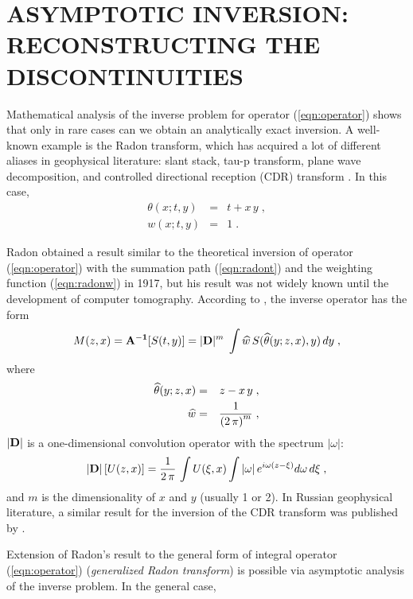 \section{ASYMPTOTIC INVERSION: RECONSTRUCTING THE DISCONTINUITIES}

Mathematical analysis of the inverse problem for operator
(\ref{eqn:operator}) shows that only in rare cases can we obtain an
analytically exact inversion. A well-known example is the Radon
transform, which has acquired a lot of different aliases in
geophysical literature: slant stack, tau-p transform, plane wave
decomposition, and controlled directional reception (CDR) transform
\cite[]{slant}. In this case,
\begin{eqnarray}
\theta(x;t,y) & = & t+x\,y\;,
\label{eqn:radont}\\
 w(x;t,y) & = & 1\;.
\label{eqn:radonw}
\end{eqnarray} 
\par
Radon obtained a result similar to the theoretical inversion of
operator (\ref{eqn:operator}) with the summation path
(\ref{eqn:radont}) and the weighting function (\ref{eqn:radonw}) in
1917, but his result was not widely known until the development of
computer tomography. According to \cite{radon}, the inverse operator
has the form
\begin{equation}
M(z,x) ={\bf A^{-1}}[S(t,y)]= |{\bf D}|^m\;\int
\widehat{w}\,S(\widehat{\theta}(y;z,x),y)\,dy\;,
\label{eqn:radon}
\end{equation}
where 
\begin{eqnarray}
\widehat{\theta}(y;z,x) & = & z-x\,y\;,
\\
\widehat{w}  & = & {1\over {\left(2\,\pi\right)^m}}\;,
\end{eqnarray} 
$|{\bf D}|$ is a one-dimensional convolution operator with the
spectrum $|\omega|$:
\begin{equation}
  \label{eq:rho}
  |{\bf D}| \left[U(z,x)\right] = \frac{1}{2\,\pi}\,
  \int U(\xi,x) \int |\omega|\,e^{i \omega (z-\xi)} d \omega \, d \xi\;,
\end{equation}
 and $m$ is the dimensionality of $x$ and $y$
(usually 1 or 2).  In Russian geophysical literature, a similar result
for the inversion of the CDR transform was published by \cite{nakham}.
\par
Extension of Radon's result to the general form of integral operator
(\ref{eqn:operator}) ({\em generalized Radon transform}) is possible
via asymptotic analysis of the inverse problem. In the general case,
